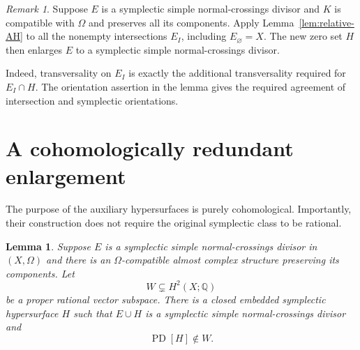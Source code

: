 \documentclass[11pt]{article}
\newtheorem{lemma}[theorem]{Lemma}
\theoremstyle{definition}
\theoremstyle{remark}
\newtheorem{remark}[theorem]{Remark}
\newcommand{\Q}{\mathbb Q}
\newcommand{\PD}{\operatorname{PD}}
\begin{document}
\begin{remark}\label{rem:relative-SNC}
Suppose $E$ is a symplectic simple normal-crossings divisor and
$K$ is compatible with $\Omega$ and preserves all its components.
Apply Lemma~\ref{lem:relative-AH} to all the nonempty intersections
$E_I$, including $E_\varnothing=X$.  The new zero set $H$
then enlarges $E$ to a symplectic simple normal-crossings divisor.

Indeed, transversality on $E_I$ is exactly the additional
transversality required for $E_I\cap H$.  The orientation assertion
in the lemma gives the required agreement of intersection and
symplectic orientations.
\end{remark}

\section{A cohomologically redundant enlargement}

The purpose of the auxiliary hypersurfaces is purely
cohomological.  Importantly, their construction does not require
the original symplectic class to be rational.

\begin{lemma}\label{lem:outside-subspace}
Suppose $E$ is a symplectic simple normal-crossings divisor in
$(X,\Omega)$ and there is an $\Omega$-compatible almost complex
structure preserving its components.  Let
\[
W\subsetneq H^2(X;\Q)
\]
be a proper rational vector subspace.  There is a closed embedded
symplectic hypersurface $H$ such that $E\cup H$ is a symplectic
simple normal-crossings divisor and
\[
\PD[H]\notin W.
\]
\end{lemma}
\end{document}
